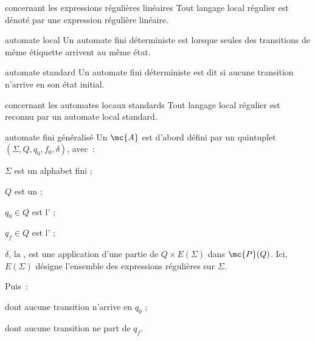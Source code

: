 \begin{adjustwidth}{-3cm}{-3cm}
\begin{proposition}{2.15}{concernant les expressions régulières linéaires}
    Tout langage local régulier est dénoté par une expression régulière linéaire.
\end{proposition}

\begin{definition}{2.16}{automate local}
    Un automate fini déterministe est  lorsque seules des transitions de même étiquette arrivent au même état.
\end{definition}

\begin{definition}{2.17}{automate standard}
    Un automate fini déterministe est dit  si aucune transition n'arrive en son état initial.
\end{definition}

\begin{proposition}{2.18}{concernant les automates locaux standards}
    Tout langage local régulier est reconnu par un automate local standard.
\end{proposition}

\begin{definition}{2.19}{automate fini généralisé}
    Un  ${\mc{A}}$ est d'abord défini par un quintuplet $(\Sigma, Q, q_0, f_0, \delta)$, avec~:
    \begin{enumeratebf}
        \item $\Sigma$ est un alphabet fini ;
        \item $Q$ est un  ;
        \item $q_0 \in Q$ est l' ;
        \item $q_f \in Q$ est l' ;
        \item $\delta$, la , est une application d'une partie de $Q \times E(\Sigma)$ dans $\mc{P}(Q)$. Ici, $E(\Sigma)$ désigne l'ensemble des expressions régulières sur $\Sigma$.
    \end{enumeratebf}
    Puis~:
    \begin{enumeratebf}
        \item dont aucune transition n'arrive en $q_0$ ;
        \item dont aucune transition ne part de $q_f$.
    \end{enumeratebf}
\end{definition}


\end{adjustwidth}
